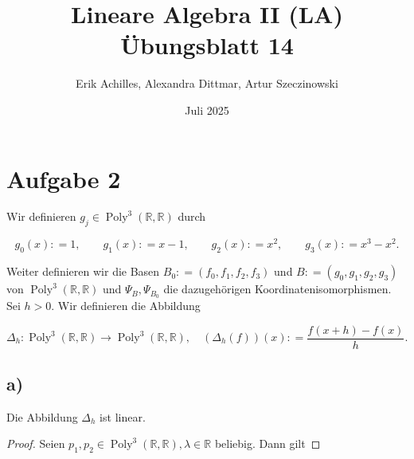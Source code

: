 \documentclass{article}
\title{Lineare Algebra II (LA) Übungsblatt 14}
\author{Erik Achilles, Alexandra Dittmar, Artur Szeczinowski}
\date{Juli 2025}
\newcommand{\RR}{\mathbb{R}}
\DeclareMathOperator{\Poly}{Poly}
\begin{document}
\section*{Aufgabe 2}

Wir definieren
$g_j \in \Poly^3(\RR, \RR)$
durch

\[
g_0(x) : = 1,
\qquad
g_1(x) : = x - 1,
\qquad
g_2(x) : = x^2,
\qquad
g_3(x) : = x^3 - x^2.
\]

Weiter definieren wir die Basen
$B_0 : = (f_0, f_1, f_2, f_3)$
und
$B : = (g_0, g_1, g_2, g_3)$
von
$\Poly^3(\RR, \RR)$
und
$\Psi_B, \Psi_{B_0}$
die dazugehörigen Koordinatenisomorphismen.
Sei
$h > 0$.
Wir definieren die Abbildung

\[
\Delta_h : \Poly^3(\RR, \RR) \to \Poly^3(\RR, \RR),
\quad
(\Delta_h(f))(x) : = \frac{f(x + h) - f(x)}{h}.
\]

\subsection*{a)}

Die Abbildung
$\Delta_h$
ist linear.

\begin{proof}
    Seien
    $p_1, p_2 \in \Poly^3(\RR,\RR), \lambda \in \RR$
    beliebig.
    Dann gilt
\end{proof}
\end{document}
